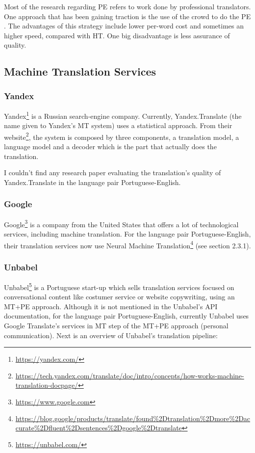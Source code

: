 Most of the research regarding PE refers to work done by professional translators. One approach that has been gaining traction is the use of the crowd to do the PE \citep{Tatsumi2012a}. The advantages of this strategy include lower per-word cost and sometimes an higher speed, compared with HT. One big disadvantage is less assurance of quality.

\subsection{Machine Translation Services}

\subsubsection{Yandex}

Yandex\footnote{\url{https://yandex.com/}} is a Russian search-engine company. Currently, Yandex.Translate (the name given to Yandex's MT system) uses a statistical approach. From their website\footnote{\url{https://tech.yandex.com/translate/doc/intro/concepts/how-works-machine-translation-docpage/}}, the system is composed by three components, a translation model, a language model and a decoder which is the part that actually does the translation.

I couldn't find any research paper evaluating the translation's quality of Yandex.Translate in the language pair Portuguese-English.

\subsubsection{Google}

Google\footnote{\url{https://www.google.com}} is a company from the United States that offers a lot of technological services, including machine translation. For the language pair Portuguese-English, their translation services now use Neural Machine Translation\footnote{\url{https://blog.google/products/translate/found\%2Dtranslation\%2Dmore\%2Daccurate\%2Dfluent\%2Dsentences\%2Dgoogle\%2Dtranslate}} (see section 2.3.1).

\subsubsection{Unbabel}

Unbabel\footnote{\url{https://unbabel.com/}} is a Portuguese start-up which sells translation services focused on conversational content like costumer service or website copywriting, using an MT+PE approach. Although it is not mentioned in the Unbabel's API documentation, for the language pair Portuguese-English, currently Unbabel uses Google Translate's services in MT step of the MT+PE approach (personal communication). Next is an overview of Unbabel's translation pipeline:

